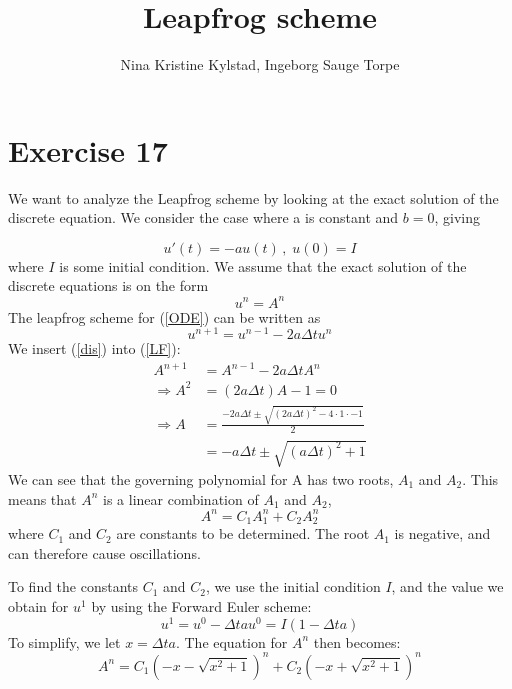 \documentclass[12pt]{article} %
\title{Leapfrog scheme}
\author{Nina Kristine Kylstad, Ingeborg Sauge Torpe}
\newcommand{\Dt}{\Delta t}
\begin{document}
\maketitle

\section*{Exercise 17}

We want to analyze the Leapfrog scheme by looking at the exact solution of the discrete equation. We consider the case where a is constant and $b = 0$, giving

\begin{equation}
u'(t) = -au(t)\,,\;u(0) = I
\label{ODE}
\end{equation}
where $I$ is some initial condition. We assume that the exact solution of the discrete equations is on the form 
\begin{equation}
u^n = A^n
\label{dis}
\end{equation}
The leapfrog scheme for (\ref{ODE}) can be written as
\begin{equation}
u^{n+1} = u^{n-1} - 2a\Delta tu^n
\label{LF}
\end{equation}
We insert (\ref{dis}) into (\ref{LF}):
\begin{align*}
A^{n+1} &= A^{n-1} - 2a\Delta t A^n\\
\Rightarrow A^2 &= (2a\Delta t)A - 1  = 0\\
\Rightarrow A &= \frac{-2a\Delta t \pm \sqrt{(2a\Delta t )^2 - 4\cdot1\cdot-1}}{2}\\
&= -a\Delta t \pm  \sqrt{(a\Delta t )^2 +1}
\end{align*}
We can see that the governing polynomial for A has two roots, $A_1$ and $A_2$. This means that $A^n$ is a linear combination of $A_1$ and $A_2$, 
\begin{equation}
A^n = C_1A_1^n + C_2A_2^n
\end{equation}
where $C_1$ and $C_2$ are constants to be determined. The root $A_1$ is negative, and can therefore cause oscillations.

To find the constants $C_1$ and $C_2$, we use the initial condition $I$, and the value we obtain for $u^1$ by using the Forward Euler scheme:
\[u^1 = u^0 - \Dt au^0 = I(1 - \Dt a)\]
To simplify, we let $x = \Dt a$. The equation for $A^n$ then becomes:
\begin{equation}
A^n = C_1(-x - \sqrt{x^2 +1})^n + C_2(-x + \sqrt{x^2 +1})^n
\end{equation}
\end{document}
